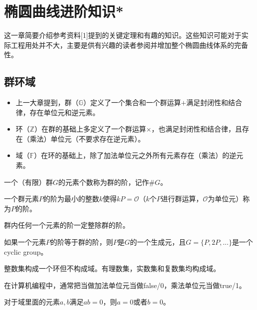 \documentclass[12pt]{article}
\newcommand{\ec}{椭圆曲线}
\newcommand{\oo}{\mathcal{O}}
\begin{document}
\section{\ec 进阶知识*}
这一章简要介绍参考资料[1]提到的关键定理和有趣的知识。这些知识可能对于实际工程用处并不大，主要是供有兴趣的读者参阅并增加整个\ec 体系的完备性。
\subsection{群环域}
\begin{itemize}
\item 上一大章提到，群（$\mathbb{G}$）定义了一个集合和一个群运算$+$满足封闭性和结合律，存在单位元和逆元素。

\item 环（$\mathbb{Z}$）在群的基础上多定义了一个群运算$\times$，也满足封闭性和结合律，且存在（乘法）单位元（不要求存在逆元素）。

\item 域（$\mathbb{F}$）在环的基础上，除了加法单位元之外所有元素存在（乘法）的逆元素。
\end{itemize}
一个（有限）群$G$的元素个数称为群的阶，记作$\#G$。

一个群元素$P$的阶为最小的整数$k$使得$kP = \oo$（$k$个$P$进行群运算，$\oo$为单位元）称为$P$的阶。

群内任何一个元素的阶一定整除群的阶。

如果一个元素$P$的阶等于群的阶，则$P$是$G$的一个生成元，且$G=\{P,2P,...\}$是一个cyclic group。


整数集构成一个环但不构成域。有理数集，实数集和复数集均构成域。

在计算机编程中，通常把当做加法单位元当做false/0，乘法单位元当做true/1。

对于域里面的元素$a,b$满足$ab=0$，则$a=0$或者$b=0$。
\end{document}
